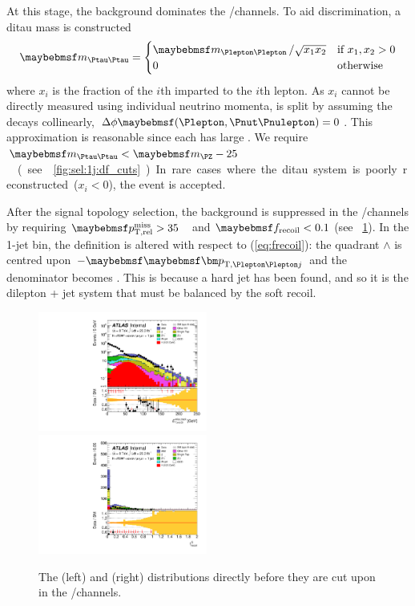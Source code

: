 At this stage, the \DYtt background dominates the \emch/\mech channels. To aid 
discrimination, a ditau mass is constructed
\begin{equation}
	\mtautau = 
		\begin{cases}
			\mll \,/ \sqrt{x_1 x_2} &\text{if}~x_1, x_2 > 0 \\
			0 &\text{otherwise}
		\end{cases}
\end{equation}
where $x_i$ is the \pt fraction of the $i$th \Ptau imparted to the $i$th lepton. As $x_i$ 
cannot be directly measured using individual neutrino momenta, \corrtrackmet is split by 
assuming the \Ptau decays collinearly, \ie 
$\Delta\phi\parenths{\Plepton,\HepProcess{\Pnut\Pnulepton}} = 0$. 
This approximation is reasonable since each \Ptau has large \pt. We require 
\unit{$\mtautau < \mZ - 25$}{\GeV} (see \Figure~\ref{fig:sel:1j:df_cuts}). In rare cases 
where the ditau system is poorly reconstructed ($x_i < 0$), the event is accepted.

After the signal topology selection, the \DYll background is suppressed in the 
\eech/\mmch channels by requiring \unit{$\trackmetrel > 35$}{\GeV} and $\frecoil < 0.1$ 
(see \Figure~\ref{fig:sel:1j:sf_cuts}). In the 1-jet bin, the \frecoil definition is 
altered with respect to (\ref{eq:frecoil}): the quadrant $\wedge$ is centred upon 
$-\ptlljvec$ and the denominator becomes \ptllj. This is because a hard jet has been 
found, and so it is the dilepton + jet system that must be balanced by the soft recoil.

\begin{figure}
	\includegraphics[width=0.495\textwidth]{tex/selection/eemm_CutTopoMll_1jet_METRel_TrackHWW_Clj_mh125_log}
	\hfill
	\includegraphics[width=0.495\textwidth]{tex/selection/eemm_CutTopoDPhill_1jet_f_recoil_ext_mh125_lin}
	\caption{The \corrtrackmetrel (left) and \frecoil (right) distributions directly 
	before they are cut upon in the \eech/\mmch channels.}
	\label{fig:sel:1j:sf_cuts}
\end{figure}

